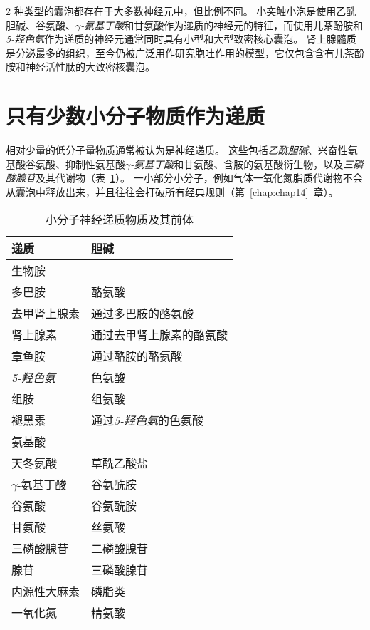 2 种类型的囊泡都存在于大多数神经元中，但比例不同。
小突触小泡是使用乙酰胆碱、谷氨酸、\textit{$\gamma$-氨基丁酸}和甘氨酸作为递质的神经元的特征，而使用儿茶酚胺和\textit{5-羟色氨}作为递质的神经元通常同时具有小型和大型致密核心囊泡。
肾上腺髓质是分泌最多的组织，至今仍被广泛用作研究胞吐作用的模型，它仅包含含有儿茶酚胺和神经活性肽的大致密核囊泡。



\section{只有少数小分子物质作为递质}

相对少量的低分子量物质通常被认为是神经递质。
这些包括\textit{乙酰胆碱}、兴奋性氨基酸谷氨酸、抑制性氨基酸\textit{$\gamma$-氨基丁酸}和甘氨酸、含胺的氨基酸衍生物，以及\textit{三磷酸腺苷}及其代谢物（表~\ref{tab:16_1}）。
一小部分小分子，例如气体一氧化氮脂质代谢物不会从囊泡中释放出来，并且往往会打破所有经典规则（第~\ref{chap:chap14}~章）。


\begin{table}[htbp]
	\caption{小分子神经递质物质及其前体} \label{tab:16_1} \centering
	\begin{tabular}{ll}
		\toprule
		递质 & 胆碱 \\
		\midrule
		生物胺 &   \\
		多巴胺 & 酪氨酸 \\
		去甲肾上腺素 & 通过多巴胺的酪氨酸 \\
		肾上腺素 & 通过去甲肾上腺素的酪氨酸 \\
		章鱼胺 & 通过酪胺的酪氨酸 \\
		\textit{5-羟色氨} & 色氨酸 \\
		组胺 & 组氨酸 \\
		褪黑素 & 通过\textit{5-羟色氨}的色氨酸 \\
		氨基酸 &  \\
		天冬氨酸 & 草酰乙酸盐 \\
		$\gamma$-氨基丁酸 & 谷氨酰胺 \\
		谷氨酸 & 谷氨酰胺 \\
		甘氨酸 & 丝氨酸 \\
		三磷酸腺苷 & 二磷酸腺苷 \\
		腺苷 & 三磷酸腺苷 \\
		内源性大麻素 & 磷脂类 \\
		一氧化氮 & 精氨酸 \\
		\bottomrule
	\end{tabular}
\end{table}


